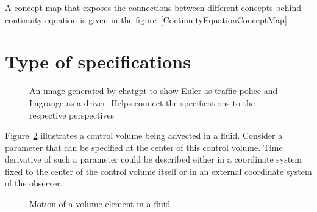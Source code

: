 A concept map that exposes the connections between different concepts behind continuity equation is given in the figure~\ref{ContinuityEquationConceptMap}.


\section{Type of specifications}

\begin{figure}[h]
\begin{center}
\end{center}
\caption{An image generated by chatgpt to show Euler as traffic police and Lagrange as a driver. Helps connect the specifications to the respective perspectives}
\label{eulerlagrange}
\end{figure}


Figure~\ref{VolumeElementMotion} illustrates a control volume being advected in a fluid. Consider a parameter that can be specified at the center of this control volume. Time derivative of such a parameter could be described either in a coordinate system fixed to the center of the control volume itself or in an external coordinate system of the observer.

\begin{figure}[h]
\begin{center}
\end{center}
\caption{Motion of a volume element in a fluid}
\label{VolumeElementMotion}
\end{figure}


